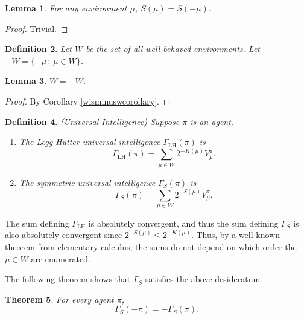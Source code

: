 \documentclass{article}
\newtheorem{theorem}{Theorem}
\newtheorem{definition}[theorem]{Definition}
\newtheorem{lemma}[theorem]{Lemma}
\def\LH{\textrm{LH}}
\def\SYM{S}
\begin{document}
\begin{lemma}
\label{Sissymmetriclemma}
    For any environment $\mu$, $S(\mu) = S(-\mu)$.
\end{lemma}

\begin{proof}
    Trivial.
\end{proof}

\begin{definition}
    Let $W$ be the set of all well-behaved environments.
    Let $-W=\{-\mu\,:\,\mu\in W\}$.
\end{definition}

\begin{lemma}
\label{WequalsminusWlemma}
$W=-W$.
\end{lemma}

\begin{proof}
    By Corollary \ref{wisminuswcorollary}.
\end{proof}

\begin{definition}
\label{universalintelligencedefn}
(Universal Intelligence)
    Suppose $\pi$ is an agent.
    \begin{enumerate}
        \item
        The \emph{Legg-Hutter universal intelligence} $\Gamma_{\LH}(\pi)$ is
        \[
            \Gamma_{\LH}(\pi) = \sum_{\mu \in W} 2^{-K(\mu)}V^\pi_\mu.
        \]
        \item
        The \emph{symmetric universal intelligence} $\Gamma_{\SYM}(\pi)$ is
        \[
            \Gamma_{\SYM}(\pi) = \sum_{\mu\in W} 2^{-S(\mu)}V^\pi_\mu.
        \]
    \end{enumerate}
\end{definition}

The sum defining $\Gamma_{\LH}$ is absolutely convergent, and thus the sum defining
$\Gamma_{\SYM}$ is also
absolutely convergent since $2^{-S(\mu)}\leq 2^{-K(\mu)}$. Thus, by a well-known
theorem from elementary calculus, the sums do not depend on which order the $\mu\in W$
are enumerated.

The following theorem shows that $\Gamma_{\SYM}$ satisfies the above desideratum.

\begin{theorem}
\label{maintheorem}
    For every agent $\pi$,
    \[
        \Gamma_{\SYM}(-\pi) = -\Gamma_{\SYM}(\pi).
    \]
\end{theorem}
\end{document}
